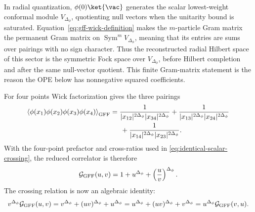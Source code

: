 In radial quantization, \(\phi(0)\ket{\vac}\) generates the scalar
lowest-weight conformal module \(V_{\Delta_\phi}\), quotienting null vectors
when the unitarity bound is saturated.  Equation~\eqref{eq:gff-wick-definition}
makes the \(m\)-particle Gram matrix the permanent Gram matrix on
\(\operatorname{Sym}^m V_{\Delta_\phi}\), meaning that its entries are sums
over pairings with no sign character.  Thus the reconstructed radial
Hilbert space of this sector is the symmetric Fock space over
\(V_{\Delta_\phi}\), before Hilbert completion and after the same null-vector
quotient.  This finite Gram-matrix statement is the reason the OPE below has
nonnegative squared coefficients.

For four points Wick factorization gives the three pairings
\begin{equation}
  \begin{split}
  \left\langle
    \phi(x_1)\phi(x_2)\phi(x_3)\phi(x_4)
  \right\rangle_{\rm GFF}
  &=
  \frac{1}{|x_{12}|^{2\Delta_\phi}|x_{34}|^{2\Delta_\phi}}
  +\frac{1}{|x_{13}|^{2\Delta_\phi}|x_{24}|^{2\Delta_\phi}}
  \\
  &\hspace{1.5em}
  +\frac{1}{|x_{14}|^{2\Delta_\phi}|x_{23}|^{2\Delta_\phi}} .
  \end{split}
  \label{eq:gff-four-point-wick}
\end{equation}
With the four-point prefactor and cross-ratios used in
\eqref{eq:identical-scalar-crossing}, the reduced correlator is therefore
\begin{equation}
  \mathcal G_{\rm GFF}(u,v)
  =
  1+u^{\Delta_\phi}
  +\left(\frac{u}{v}\right)^{\Delta_\phi}.
  \label{eq:gff-reduced-four-point}
\end{equation}
The crossing relation is now an algebraic identity:
\begin{equation}
  v^{\Delta_\phi}\mathcal G_{\rm GFF}(u,v)
  =
  v^{\Delta_\phi}
  +(uv)^{\Delta_\phi}
  +u^{\Delta_\phi}
  =
  u^{\Delta_\phi}
  +(uv)^{\Delta_\phi}
  +v^{\Delta_\phi}
  =
  u^{\Delta_\phi}\mathcal G_{\rm GFF}(v,u).
  \label{eq:gff-crossing-check}
\end{equation}

